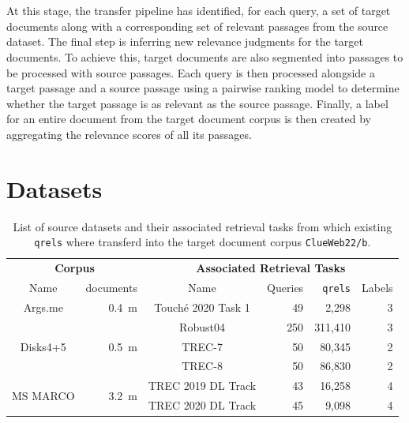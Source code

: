 \\\\
At this stage, the transfer pipeline has identified, for each query, a set of target documents along with a corresponding set of relevant passages from the source dataset. The final step is inferring new relevance judgments for the target documents. To achieve this, target documents are also segmented into passages to be processed with source passages. Each query is then processed alongside a target passage and a source passage using a pairwise ranking model to determine whether the target passage is as relevant as the source passage. Finally, a label for an entire document from the target document corpus is then created by aggregating the relevance scores of all its passages.

\section{Datasets}\label{datasets}

\begin{table}[t]
    \centering
    \footnotesize
    \caption{List of source datasets and their associated retrieval tasks from which existing \texttt{qrels} where transferd into the target document corpus \texttt{ClueWeb22/b}.}
    \label{tab:datasets}
    \begin{tabular}{crcrrr}
        \toprule
        \multicolumn{2}{c}{\textbf{Corpus}} & \multicolumn{4}{c}{\textbf{ Associated Retrieval Tasks}} \\
        \cmidrule(lr){1-2} \cmidrule(lr){3-6}
        Name & documents  & Name & Queries &\texttt{qrels} & Labels \\
        \toprule
        
        Args.me & 0.4~m & Touché 2020 Task 1 & 49 & 2,298 & 3 \\
        \midrule

        \multirow{3}{*}{Disks4+5} & \multirow{3}{*}{0.5~m} & Robust04 & 250 & 311,410 & 3 \\
        & & TREC-7 & 50 & 80,345 & 2 \\
        & & TREC-8 & 50 & 86,830 & 2 \\
        \midrule

        \multirow{2}{*}{MS MARCO} & \multirow{2}{*}{3.2~m} & TREC 2019 DL Track & 43 & 16,258 & 4 \\
        & & TREC 2020 DL Track & 45 & 9,098 & 4 \\
        
        \bottomrule
    \end{tabular}
\end{table}

